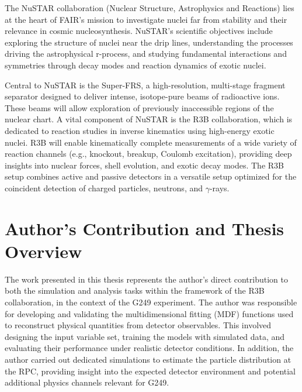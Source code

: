 \begin{itemize}
	The NuSTAR collaboration (Nuclear Structure, Astrophysics and Reactions) lies at the heart of \gls{FAIR}’s mission to investigate nuclei far from stability and their relevance in cosmic nucleosynthesis. NuSTAR's scientific objectives include exploring the structure of nuclei near the drip lines, understanding the processes driving the astrophysical r-process, and studying fundamental interactions and symmetries through decay modes and reaction dynamics of exotic nuclei.
	
	Central to NuSTAR is the Super-FRS, a high-resolution, multi-stage fragment separator designed to deliver intense, isotope-pure beams of radioactive ions. These beams will allow exploration of previously inaccessible regions of the nuclear chart. A vital component of NuSTAR is the \gls{R3B} collaboration, which is dedicated to reaction studies in inverse kinematics using high-energy exotic nuclei. \gls{R3B} will enable kinematically complete measurements of a wide variety of reaction channels (e.g., knockout, breakup, Coulomb excitation), providing deep insights into nuclear forces, shell evolution, and exotic decay modes. The \gls{R3B} setup combines active and passive detectors in a versatile setup optimized for the coincident detection of charged particles, neutrons, and $\gamma$-rays.
\end{itemize}




\section{Author's Contribution and Thesis Overview}








The work presented in this thesis represents the author’s direct contribution to both the simulation and analysis tasks within the framework of the \gls{R3B} collaboration, in the context of the G249 experiment. The author was responsible for developing and validating the multidimensional fitting (MDF) functions used to reconstruct physical quantities from detector observables. This involved designing the input variable set, training the models with simulated data, and evaluating their performance under realistic detector conditions. In addition, the author carried out dedicated simulations to estimate the particle distribution at the RPC, providing insight into the expected detector environment and potential additional physics channels relevant for G249.

